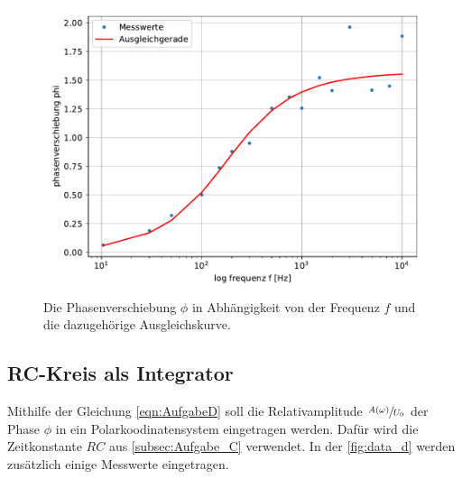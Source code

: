 \begin{figure}
  \centering
  \includegraphics{content/data_c_ausgleich.pdf}
  \caption{Die Phasenverschiebung $\phi$ in Abhängigkeit von der Frequenz $f$ und die dazugehörige Ausgleichskurve.}
  \label{fig:data_c}
\end{figure}

\subsection{RC-Kreis als Integrator}
\label{Aufgabe_d}
Mithilfe der Gleichung \eqref{eqn:AufgabeD} soll die Relativamplitude $\sfrac{A(\omega)}{U_0}$ der Phase $\phi$ in ein Polarkoodinatensystem eingetragen werden.
Dafür wird die Zeitkonstante $RC$ aus \autoref{subsec:Aufgabe_C} verwendet.
In der \autoref{fig:data_d} werden zusätzlich einige Messwerte eingetragen.


